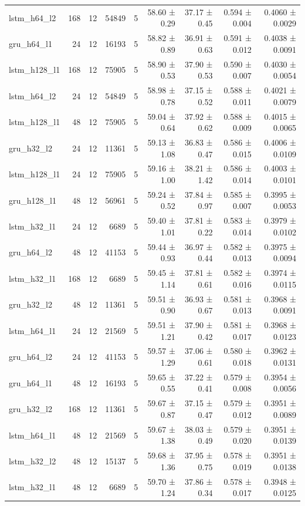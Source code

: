 \begin{table}[htbp]
\begin{tabular}{lrrrrrrrr}
lstm\_h64\_l2 & 168 & 12 & 54849 & 5 & 58.60 ± 0.29 & 37.17 ± 0.45 & 0.594 ± 0.004 & 0.4060 ± 0.0029 \\
gru\_h64\_l1 & 24 & 12 & 16193 & 5 & 58.82 ± 0.89 & 36.91 ± 0.63 & 0.591 ± 0.012 & 0.4038 ± 0.0091 \\
lstm\_h128\_l1 & 168 & 12 & 75905 & 5 & 58.90 ± 0.53 & 37.90 ± 0.53 & 0.590 ± 0.007 & 0.4030 ± 0.0054 \\
lstm\_h64\_l2 & 24 & 12 & 54849 & 5 & 58.98 ± 0.78 & 37.15 ± 0.52 & 0.588 ± 0.011 & 0.4021 ± 0.0079 \\
lstm\_h128\_l1 & 48 & 12 & 75905 & 5 & 59.04 ± 0.64 & 37.92 ± 0.62 & 0.588 ± 0.009 & 0.4015 ± 0.0065 \\
gru\_h32\_l2 & 24 & 12 & 11361 & 5 & 59.13 ± 1.08 & 36.83 ± 0.47 & 0.586 ± 0.015 & 0.4006 ± 0.0109 \\
lstm\_h128\_l1 & 24 & 12 & 75905 & 5 & 59.16 ± 1.00 & 38.21 ± 1.42 & 0.586 ± 0.014 & 0.4003 ± 0.0101 \\
gru\_h128\_l1 & 48 & 12 & 56961 & 5 & 59.24 ± 0.52 & 37.84 ± 0.97 & 0.585 ± 0.007 & 0.3995 ± 0.0053 \\
lstm\_h32\_l1 & 24 & 12 & 6689 & 5 & 59.40 ± 1.01 & 37.81 ± 0.22 & 0.583 ± 0.014 & 0.3979 ± 0.0102 \\
gru\_h64\_l2 & 48 & 12 & 41153 & 5 & 59.44 ± 0.93 & 36.97 ± 0.44 & 0.582 ± 0.013 & 0.3975 ± 0.0094 \\
lstm\_h32\_l1 & 168 & 12 & 6689 & 5 & 59.45 ± 1.14 & 37.81 ± 0.61 & 0.582 ± 0.016 & 0.3974 ± 0.0115 \\
gru\_h32\_l2 & 48 & 12 & 11361 & 5 & 59.51 ± 0.90 & 36.93 ± 0.67 & 0.581 ± 0.013 & 0.3968 ± 0.0091 \\
lstm\_h64\_l1 & 24 & 12 & 21569 & 5 & 59.51 ± 1.21 & 37.90 ± 0.42 & 0.581 ± 0.017 & 0.3968 ± 0.0123 \\
gru\_h64\_l2 & 24 & 12 & 41153 & 5 & 59.57 ± 1.29 & 37.06 ± 0.61 & 0.580 ± 0.018 & 0.3962 ± 0.0131 \\
gru\_h64\_l1 & 48 & 12 & 16193 & 5 & 59.65 ± 0.55 & 37.22 ± 0.41 & 0.579 ± 0.008 & 0.3954 ± 0.0056 \\
gru\_h32\_l2 & 168 & 12 & 11361 & 5 & 59.67 ± 0.87 & 37.15 ± 0.47 & 0.579 ± 0.012 & 0.3951 ± 0.0089 \\
lstm\_h64\_l1 & 48 & 12 & 21569 & 5 & 59.67 ± 1.38 & 38.03 ± 0.49 & 0.579 ± 0.020 & 0.3951 ± 0.0139 \\
lstm\_h32\_l2 & 48 & 12 & 15137 & 5 & 59.68 ± 1.36 & 37.95 ± 0.75 & 0.578 ± 0.019 & 0.3951 ± 0.0138 \\
lstm\_h32\_l1 & 48 & 12 & 6689 & 5 & 59.70 ± 1.24 & 37.86 ± 0.34 & 0.578 ± 0.017 & 0.3948 ± 0.0125 \\

\end{tabular}
\end{table}
